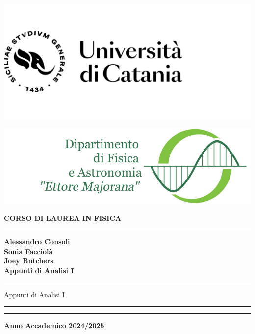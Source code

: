 \begin{titlepage}
    \begin{center}
        \begin{minipage}[ht!]{0.49\textwidth}
                \includegraphics[width=\textwidth]{images/Logo+UniCT.png}
        \end{minipage}
        \hfill
        \begin{minipage}[th!]{0.49\textwidth}
                \includegraphics[width=\textwidth]{images/LogoDfa2.png}
        \end{minipage}
        \large
        \textbf{CORSO DI LAUREA IN FISICA}
        \vspace{0.5cm}
        \hrule
        \vspace{3cm}
        \centering
        \textbf{Alessandro Consoli\\Sonia Facciolà\\Joey Butchers}\\
        \vspace{1cm}
        \Huge{\textbf{Appunti di Analisi I}}\\
        
        \vfill
        
        \begin{minipage}[h]{0.35\textwidth}
            \hrule
            \vspace{0.3cm}
            \small \centering
            Appunti di Analisi I
            \vspace{0.35cm}
            \hrule
        \end{minipage}
        
        \vfill
        
        \hrule
        \vspace{0.3cm}
        \normalsize
        \textbf{Anno Accademico 2024/2025}
    \end{center}

    
\end{titlepage}